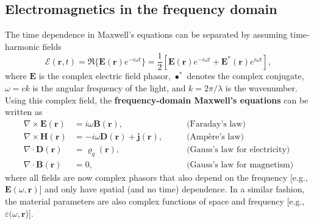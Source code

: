 \subsection*{Electromagnetics in the frequency domain}

The time dependence in Maxwell's equations can be separated by assuming
time-harmonic fields
\begin{equation}
 \bm{\mathcal{E}}(\mathbf{r}, t) = \Re \{ \mathbf{E}(\mathbf{r}) e^{-i\omega
 t} \}= \frac{1}{2}\left[ \mathbf{E}(\mathbf{r}) e^{-i\omega t} +
 \mathbf{E}^*(\mathbf{r}) e^{i\omega t}\right],
\end{equation}
where $\mathbf{E}$ is the complex electric field phasor, $\bullet^*$ denotes the complex conjugate, $\omega=ck$ is the angular
frequency of the light, and $k=2\pi/\lambda$ is the wavenumber.
Using this complex field, the \textbf{frequency-domain Maxwell's equations} can be written as
\begin{align}
    \nabla \times \mathbf{E}(\mathbf{r}) & = i\omega \mathbf{B}(\mathbf{r}),
 \quad \quad                          & \text{(Faraday's law)} \label{eq:curlE_freq}                                   \\
    \nabla \times \mathbf{H}(\mathbf{r}) & = -i\omega \mathbf{D}(\mathbf{r}) +
 \mathbf{j}(\mathbf{r}), \quad \quad  & \text{(Ampère's law)}
    \label{eq:curlH_freq}                                                                                                 \\
    \nabla \cdot \mathbf{D}(\mathbf{r})  & = \varrho_q(\mathbf{r}), \quad \quad
                                         & \text{(Gauss's law for electricity)} \label{eq:divD_freq}                      \\
    \nabla \cdot \mathbf{B}(\mathbf{r})  & = 0, \quad \quad                                          & \text{(Gauss's law
 for magnetism)} \label{eq:divB_freq}
\end{align}
where all fields are now complex phasors that also depend on the frequency
[e.g., $\mathbf{E}(\omega, \mathbf{r})$] and only have spatial (and no time) dependence. In a
similar fashion,
the material parameters are also complex functions of space and frequency [e.g.,
$\varepsilon(\omega, \mathbf{r}$)].

